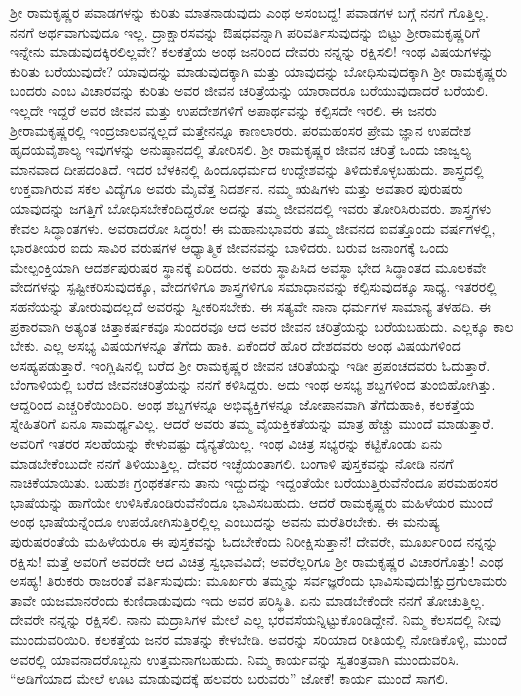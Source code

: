 ಶ‍್ರೀ ರಾಮಕೃಷ್ಣರ ಪವಾಡಗಳನ್ನು ಕುರಿತು ಮಾತನಾಡುವುದು ಎಂಥ ಅಸಂಬದ್ದ! ಪವಾಡಗಳ ಬಗ್ಗೆ ನನಗೆ ಗೊತ್ತಿಲ್ಲ. ನನಗೆ ಅರ್ಥವಾಗುವುದೂ ಇಲ್ಲ. ದ್ರಾಕ್ಷಾರಸವನ್ನು ಔಷಧವನ್ನಾಗಿ ಪರಿವರ್ತಿಸುವುದನ್ನು ಬಿಟ್ಟು ಶ‍್ರೀರಾಮಕೃಷ್ಣರಿಗೆ ಇನ್ನೇನು ಮಾಡುವುದಕ್ಕಿರಲಿಲ್ಲವೇ? ಕಲಕತ್ತೆಯ ಅಂಥ ಜನರಿಂದ ದೇವರು ನನ್ನನ್ನು ರಕ್ಷಿಸಲಿ! ಇಂಥ ವಿಷಯಗಳನ್ನು ಕುರಿತು ಬರೆಯುವುದೇ? ಯಾವುದನ್ನು ಮಾಡುವುದಕ್ಕಾಗಿ ಮತ್ತು ಯಾವುದನ್ನು ಬೋಧಿಸುವುದಕ್ಕಾಗಿ ಶ‍್ರೀ ರಾಮಕೃಷ್ಣರು ಬಂದರು ಎಂಬ ವಿಚಾರವನ್ನು ಕುರಿತು ಅವರ ಜೀವನ ಚರಿತ್ರೆಯನ್ನು ಯಾರಾದರೂ ಬರೆಯುವುದಾದರೆ ಬರೆಯಲಿ. ಇಲ್ಲದೇ ಇದ್ದರೆ ಅವರ ಜೀವನ ಮತ್ತು ಉಪದೇಶಗಳಿಗೆ ಅಪಾರ್ಥವನ್ನು ಕಲ್ಪಿಸದೇ ಇರಲಿ. ಈ ಜನರು ಶ‍್ರೀರಾಮಕೃಷ್ಣರಲ್ಲಿ ಇಂದ್ರಜಾಲವನ್ನಲ್ಲದೆ ಮತ್ತೇನನ್ನೂ ಕಾಣಲಾರರು. ಪರಮಹಂಸರ ಪ್ರೇಮ ಜ್ಞಾನ ಉಪದೇಶ ಹೃದಯವೈಶಾಲ್ಯ ಇವುಗಳನ್ನು ಅನುಷ್ಠಾನದಲ್ಲಿ ತೋರಿಸಲಿ. ಶ‍್ರೀ ರಾಮಕೃಷ್ಣರ ಜೀವನ ಚರಿತ್ರೆ ಒಂದು ಜಾಜ್ವಲ್ಯ ಮಾನವಾದ ದೀಪದಂತಿದೆ. ಇದರ ಬೆಳಕಿನಲ್ಲಿ ಹಿಂದೂಧರ್ಮದ ಉದ್ದೇಶವನ್ನು ತಿಳಿದುಕೊಳ್ಳಬಹುದು. ಶಾಸ್ತ್ರದಲ್ಲಿ ಉಕ್ತವಾಗಿರುವ ಸಕಲ ವಿದ್ಯೆಗೂ ಅವರು ಮೈವೆತ್ತ ನಿದರ್ಶನ. ನಮ್ಮ ಋಷಿಗಳು ಮತ್ತು ಅವತಾರ ಪುರುಷರು ಯಾವುದನ್ನು ಜಗತ್ತಿಗೆ ಬೋಧಿಸಬೇಕೆಂದಿದ್ದರೋ ಅದನ್ನು ತಮ್ಮ ಜೀವನದಲ್ಲಿ ಇವರು ತೋರಿಸಿರುವರು. ಶಾಸ್ತ್ರಗಳು ಕೇವಲ ಸಿದ್ಧಾಂತಗಳು. ಅವರಾದರೋ ಸಿದ್ಧರು! ಈ ಮಹಾನುಭಾವರು ತಮ್ಮ ಜೀವನದ ಐವತ್ತೊಂದು ವರ್ಷಗಳಲ್ಲಿ, ಭಾರತೀಯರ ಐದು ಸಾವಿರ ವರುಷಗಳ ಆಧ್ಯಾತ್ಮಿಕ ಜೀವನವನ್ನು ಬಾಳಿದರು. ಬರುವ ಜನಾಂಗಕ್ಕೆ ಒಂದು ಮೇಲ್ಪಂಕ್ತಿಯಾಗಿ ಆದರ್ಶಪುರುಷರ ಸ್ಥಾನಕ್ಕೆ ಏರಿದರು. ಅವರು ಸ್ಥಾಪಿಸಿದ ಅವಸ್ಥಾ ಭೇದ ಸಿದ್ಧಾಂತದ ಮೂಲಕವೇ ವೇದಗಳನ್ನು ಸ್ಪಷ್ಟೀಕರಿಸುವುದಕ್ಕೂ, ವೇದಗಳಿಗೂ ಶಾಸ್ತ್ರಗಳಿಗೂ ಸಮಾಧಾನವನ್ನು ಕಲ್ಪಿಸುವುದಕ್ಕೂ ಸಾಧ್ಯ. ಇತರರಲ್ಲಿ ಸಹನೆಯನ್ನು ತೋರುವುದಲ್ಲದೆ ಅವರನ್ನು ಸ್ವೀಕರಿಸಬೇಕು. ಈ ಸತ್ಯವೇ ನಾನಾ ಧರ್ಮಗಳ ಸಾಮಾನ್ಯ ತಳಹದಿ. ಈ ಪ್ರಕಾರವಾಗಿ ಅತ್ಯಂತ ಚಿತ್ತಾಕರ್ಷಕವೂ ಸುಂದರವೂ ಆದ ಅವರ ಜೀವನ ಚರಿತ್ರೆಯನ್ನು ಬರೆಯಬಹುದು. ಎಲ್ಲಕ್ಕೂ ಕಾಲ ಬೇಕು. ಎಲ್ಲ ಅಸಭ್ಯ ವಿಷಯಗಳನ್ನೂ ತೆಗೆದು ಹಾಕಿ. ಏಕೆಂದರೆ ಹೊರ ದೇಶದವರು ಅಂಥ ವಿಷಯಗಳಿಂದ ಅಸಹ್ಯಪಡುತ್ತಾರೆ. ಇಂಗ್ಲಿಷಿನಲ್ಲಿ ಬರೆದ ಶ‍್ರೀ ರಾಮಕೃಷ್ಣರ ಜೀವನ ಚರಿತೆಯನ್ನು ಇಡೀ ಪ್ರಪಂಚದವರು ಓದುತ್ತಾರೆ. ಬೆಂಗಾಳಿಯಲ್ಲಿ ಬರೆದ ಜೀವನಚರಿತ್ರೆಯನ್ನು ನನಗೆ ಕಳಿಸಿದ್ದರು. ಅದು ಇಂಥ ಅಸಭ್ಯ ಶಬ್ದಗಳಿಂದ ತುಂಬಿಹೋಗಿತ್ತು. ಆದ್ದರಿಂದ ಎಚ್ಚರಿಕೆಯಿಂದಿರಿ. ಅಂಥ ಶಬ್ದಗಳನ್ನೂ ಅಭಿವ್ಯಕ್ತಿಗಳನ್ನೂ ಜೋಪಾನವಾಗಿ ತೆಗೆದುಹಾಕಿ, ಕಲಕತ್ತೆಯ ಸ್ನೇಹಿತರಿಗೆ ಏನೂ ಸಾಮರ್ಥ್ಯವಿಲ್ಲ. ಆದರೆ ಅವರು ತಮ್ಮ ವೈಯಕ್ತಿಕತೆಯನ್ನು ಮಾತ್ರ ಹೆಚ್ಚು ಮುಂದೆ ಮಾಡುತ್ತಾರೆ. ಅವರಿಗೆ ಇತರರ ಸಲಹೆಯನ್ನು ಕೇಳುವಷ್ಟು ದೈನ್ಯತೆಯಿಲ್ಲ. ಇಂಥ ವಿಚಿತ್ರ ಸಭ್ಯರನ್ನು ಕಟ್ಟಿಕೊಂಡು ಏನು ಮಾಡಬೇಕೆಂಬುದೇ ನನಗೆ ತಿಳಿಯುತ್ತಿಲ್ಲ. ದೇವರ ಇಚ್ಛೆಯಂತಾಗಲಿ. ಬಂಗಾಳಿ ಪುಸ್ತಕವನ್ನು ನೋಡಿ ನನಗೆ ನಾಚಿಕೆಯಾಯಿತು. ಬಹುಶಃ ಗ್ರಂಥಕರ್ತನು ತಾನು ಇದ್ದುದನ್ನು ಇದ್ದಂತೆಯೇ ಬರೆಯುತ್ತಿರುವೆನೆಂದೂ ಪರಮಹಂಸರ ಭಾಷೆಯನ್ನು ಹಾಗೆಯೇ ಉಳಿಸಿಕೊಂಡಿರುವೆನೆಂದೂ ಭಾವಿಸಬಹುದು. ಆದರೆ ರಾಮಕೃಷ್ಣರು ಮಹಿಳೆಯರ ಮುಂದೆ ಅಂಥ ಭಾಷೆಯನ್ನೆಂದೂ ಉಪಯೋಗಿಸುತ್ತಿರಲ್ಲಿಲ್ಲ ಎಂಬುದನ್ನು ಅವನು ಮರೆತಿರಬೇಕು. ಈ ಮನುಷ್ಯ ಪುರುಷರಂತೆಯೆ ಮಹಿಳೆಯರೂ ಈ ಪುಸ್ತಕವನ್ನು ಓದಬೇಕೆಂದು ನಿರೀಕ್ಷಿಸುತ್ತಾನೆ! ದೇವರೇ, ಮೂರ್ಖರಿಂದ ನನ್ನನ್ನು ರಕ್ಷಿಸು! ಮತ್ತೆ ಅವರಿಗೆ ಅವರದೇ ಆದ ವಿಚಿತ್ರ ಸ್ವಭಾವವಿದೆ; ಅವರೆಲ್ಲರಿಗೂ ಶ‍್ರೀ ರಾಮಕೃಷ್ಣರ ವಿಚಾರಗೊತ್ತು! ಎಂಥ ಅಸಹ್ಯ! ತಿರುಕರು ರಾಜರಂತೆ ವರ್ತಿಸುವುದು: ಮೂರ್ಖರು ತಮ್ಮನ್ನು ಸರ್ವಜ್ಞರೆಂದು ಭಾವಿಸುವುದು!ಕ್ಷುದ್ರಗುಲಾಮರು ತಾವೇ ಯಜಮಾನರೆಂದು ಕುಣಿದಾಡುವುದು ಇದು ಅವರ ಪರಿಸ್ಥಿತಿ. ಏನು ಮಾಡಬೇಕೆಂದೇ ನನಗೆ ತೋಚುತ್ತಿಲ್ಲ. ದೇವರೇ ನನ್ನನ್ನು ರಕ್ಷಿಸಲಿ. ನಾನು ಮದ್ರಾಸಿಗಳ ಮೇಲೆ ಎಲ್ಲ ಭರವಸೆಯನ್ನಿಟ್ಟುಕೊಂಡಿದ್ದೇನೆ. ನಿಮ್ಮ ಕೆಲಸದಲ್ಲಿ ನೀವು ಮುಂದುವರಿಯಿರಿ. ಕಲಕತ್ತೆಯ ಜನರ ಮಾತನ್ನು ಕೇಳಬೇಡಿ. ಅವರನ್ನು ಸರಿಯಾದ ರೀತಿಯಲ್ಲಿ ನೋಡಿಕೊಳ್ಳಿ, ಮುಂದೆ ಅವರಲ್ಲಿ ಯಾವನಾದರೊಬ್ಬನು ಉತ್ತಮನಾಗಬಹುದು. ನಿಮ್ಮ ಕಾರ್ಯವನ್ನು ಸ್ವತಂತ್ರವಾಗಿ ಮುಂದುವರಿಸಿ. “ಅಡಿಗೆಯಾದ ಮೇಲೆ ಊಟ ಮಾಡುವುದಕ್ಕೆ ಹಲವರು ಬರುವರು” ಜೋಕೆ! ಕಾರ್ಯ ಮುಂದೆ ಸಾಗಲಿ.

